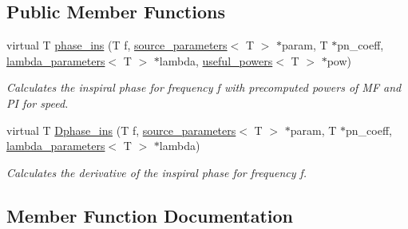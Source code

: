 \subsection*{Public Member Functions}
\begin{DoxyCompactItemize}
\item 
virtual T \hyperlink{classppE__IMRPhenomPv2__Inspiral_a829118c33d81ed4bcc4b48e7349c58f6}{phase\+\_\+ins} (T f, \hyperlink{structsource__parameters}{source\+\_\+parameters}$<$ T $>$ $\ast$param, T $\ast$pn\+\_\+coeff, \hyperlink{structlambda__parameters}{lambda\+\_\+parameters}$<$ T $>$ $\ast$lambda, \hyperlink{structuseful__powers}{useful\+\_\+powers}$<$ T $>$ $\ast$pow)
\begin{DoxyCompactList}\small\item\em Calculates the inspiral phase for frequency f with precomputed powers of MF and PI for speed. \end{DoxyCompactList}\item 
virtual T \hyperlink{classppE__IMRPhenomPv2__Inspiral_a2975dbfd6aba25f57b93dfb68fac24b8}{Dphase\+\_\+ins} (T f, \hyperlink{structsource__parameters}{source\+\_\+parameters}$<$ T $>$ $\ast$param, T $\ast$pn\+\_\+coeff, \hyperlink{structlambda__parameters}{lambda\+\_\+parameters}$<$ T $>$ $\ast$lambda)
\begin{DoxyCompactList}\small\item\em Calculates the derivative of the inspiral phase for frequency f. \end{DoxyCompactList}\end{DoxyCompactItemize}


\subsection{Member Function Documentation}
\mbox{\label{classppE__IMRPhenomPv2__Inspiral_a2975dbfd6aba25f57b93dfb68fac24b8}} 
